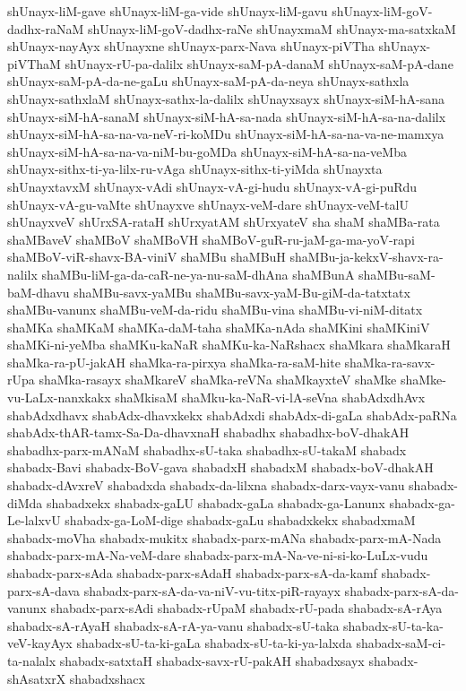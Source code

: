 {shUnayx-liM-gave
shUnayx-liM-ga-vide
shUnayx-liM-gavu
shUnayx-liM-goV-dadhx-raNaM
shUnayx-liM-goV-dadhx-raNe
shUnayxmaM
shUnayx-ma-satxkaM
shUnayx-nayAyx
shUnayxne
shUnayx-parx-Nava
shUnayx-piVTha
shUnayx-piVThaM
shUnayx-rU-pa-dalilx
shUnayx-saM-pA-danaM
shUnayx-saM-pA-dane
shUnayx-saM-pA-da-ne-gaLu
shUnayx-saM-pA-da-neya
shUnayx-sathxla
shUnayx-sathxlaM
shUnayx-sathx-la-dalilx
shUnayxsayx
shUnayx-siM-hA-sana
shUnayx-siM-hA-sanaM
shUnayx-siM-hA-sa-nada
shUnayx-siM-hA-sa-na-dalilx
shUnayx-siM-hA-sa-na-va-neV-ri-koMDu
shUnayx-siM-hA-sa-na-va-ne-mamxya
shUnayx-siM-hA-sa-na-va-niM-bu-goMDa
shUnayx-siM-hA-sa-na-veMba
shUnayx-sithx-ti-ya-lilx-ru-vAga
shUnayx-sithx-ti-yiMda
shUnayxta
shUnayxtavxM
shUnayx-vAdi
shUnayx-vA-gi-hudu
shUnayx-vA-gi-puRdu
shUnayx-vA-gu-vaMte
shUnayxve
shUnayx-veM-dare
shUnayx-veM-talU
shUnayxveV
shUrxSA-rataH
shUrxyatAM
shUrxyateV
sha
shaM
shaMBa-rata
shaMBaveV
shaMBoV
shaMBoVH
shaMBoV-guR-ru-jaM-ga-ma-yoV-rapi
shaMBoV-viR-shavx-BA-viniV
shaMBu
shaMBuH
shaMBu-ja-kekxV-shavx-ra-nalilx
shaMBu-liM-ga-da-caR-ne-ya-nu-saM-dhAna
shaMBunA
shaMBu-saM-baM-dhavu
shaMBu-savx-yaMBu
shaMBu-savx-yaM-Bu-giM-da-tatxtatx
shaMBu-vanunx
shaMBu-veM-da-ridu
shaMBu-vina
shaMBu-vi-niM-ditatx
shaMKa
shaMKaM
shaMKa-daM-taha
shaMKa-nAda
shaMKini
shaMKiniV
shaMKi-ni-yeMba
shaMKu-kaNaR
shaMKu-ka-NaRshacx
shaMkara
shaMkaraH
shaMka-ra-pU-jakAH
shaMka-ra-pirxya
shaMka-ra-saM-hite
shaMka-ra-savx-rUpa
shaMka-rasayx
shaMkareV
shaMka-reVNa
shaMkayxteV
shaMke
shaMke-vu-LaLx-nanxkakx
shaMkisaM
shaMku-ka-NaR-vi-lA-seVna
shabAdxdhAvx
shabAdxdhavx
shabAdx-dhavxkekx
shabAdxdi
shabAdx-di-gaLa
shabAdx-paRNa
shabAdx-thAR-tamx-Sa-Da-dhavxnaH
shabadhx
shabadhx-boV-dhakAH
shabadhx-parx-mANaM
shabadhx-sU-taka
shabadhx-sU-takaM
shabadx
shabadx-Bavi
shabadx-BoV-gava
shabadxH
shabadxM
shabadx-boV-dhakAH
shabadx-dAvxreV
shabadxda
shabadx-da-lilxna
shabadx-darx-vayx-vanu
shabadx-diMda
shabadxekx
shabadx-gaLU
shabadx-gaLa
shabadx-ga-Lanunx
shabadx-ga-Le-lalxvU
shabadx-ga-LoM-dige
shabadx-gaLu
shabadxkekx
shabadxmaM
shabadx-moVha
shabadx-mukitx
shabadx-parx-mANa
shabadx-parx-mA-Nada
shabadx-parx-mA-Na-veM-dare
shabadx-parx-mA-Na-ve-ni-si-ko-LuLx-vudu
shabadx-parx-sAda
shabadx-parx-sAdaH
shabadx-parx-sA-da-kamf
shabadx-parx-sA-dava
shabadx-parx-sA-da-va-niV-vu-titx-piR-rayayx
shabadx-parx-sA-da-vanunx
shabadx-parx-sAdi
shabadx-rUpaM
shabadx-rU-pada
shabadx-sA-rAya
shabadx-sA-rAyaH
shabadx-sA-rA-ya-vanu
shabadx-sU-taka
shabadx-sU-ta-ka-veV-kayAyx
shabadx-sU-ta-ki-gaLa
shabadx-sU-ta-ki-ya-lalxda
shabadx-saM-ci-ta-nalalx
shabadx-satxtaH
shabadx-savx-rU-pakAH
shabadxsayx
shabadx-shAsatxrX
shabadxshacx
}
